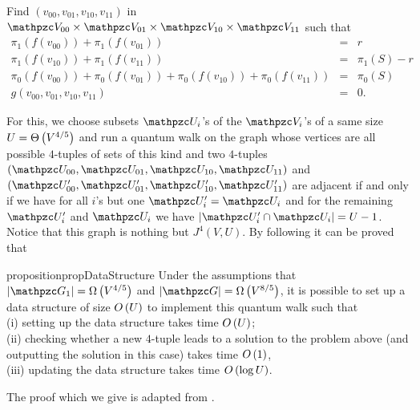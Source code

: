 \begin{problem}\label{pb:shamir_shroeppel}
Find $(v_{00},v_{01},v_{10},v_{11})$ in $\zV_{00}\times \zV_{01} \times \zV_{10} \times \zV_{11}$ such that 
\begin{eqnarray*}
\pi_1(f(v_{00})) +\pi_1(f(v_{01})) & = & r \\
\pi_1(f(v_{10}))  +\pi_1(f(v_{11})) & = & \pi_1(S)-r \\
\pi_0(f(v_{00})) + \pi_0(f(v_{01})) + \pi_0(f(v_{10})) + \pi_0(f(v_{11})) & = &\pi_0(S)\\
g(v_{00},v_{01},v_{10},v_{11}) & = & 0.
\end{eqnarray*}
\end{problem}

For this, we choose subsets $\zU_i$'s of the $\zV_i$'s of a same size $U=\Theta\left( V^{4/5} \right)$ and 
run a quantum walk on the graph whose vertices are all possible $4$-tuples of
sets of this kind and two $4$-tuples $(\zU_{00},\zU_{01},\zU_{10},\zU_{11})$ and
$(\zU_{00}',\zU_{01}',\zU_{10}',\zU_{11}')$ are adjacent if and only if we have for all $i$'s but one $\zU'_i=\zU_i$ and
for the remaining  $\zU'_i$ and $\zU_i$ we have $|\zU'_i \cap \zU_i|=U-1$.
Notice that this graph is nothing but $J^4(V,U)$.
By following \cite[Sec. 4]{BJLM13} it can be proved that 
\begin{restatable}{proposition}{propDataStructure}
\label{prop:data_structure}
Under the assumptions that $|\zG_1| = \Om{V^{4/5}}$ and $|\zG| = \Om{V^{8/5}}$,
it is possible to set up a data structure of size $O\left( U \right)$
to implement this quantum walk such that \\
(i) setting up the data structure takes time $O\left( U \right)$;\\
(ii) checking whether a new $4$-tuple leads to a solution to the problem above (and outputting the solution in this case) 
takes time $O\left( 1 \right)$,\\
(iii) updating the data structure takes time $O\left( \log U \right)$.
\end{restatable}
The proof which we give is adapted from \cite[Sec. 4]{BJLM13}.
